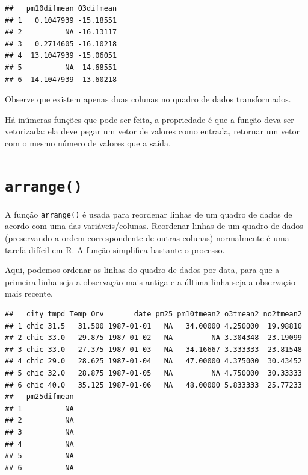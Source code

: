 \documentclass[]{book}
\newenvironment{Shaded}{\begin{snugshade}}{\end{snugshade}}
\newcommand{\KeywordTok}[1]{\textcolor[rgb]{0.13,0.29,0.53}{\textbf{#1}}}
\newcommand{\NormalTok}[1]{#1}
\newcommand{\OperatorTok}[1]{\textcolor[rgb]{0.81,0.36,0.00}{\textbf{#1}}}
\newcommand{\StringTok}[1]{\textcolor[rgb]{0.31,0.60,0.02}{#1}}
\begin{document}
\begin{verbatim}
##   pm10difmean O3difmean
## 1   0.1047939 -15.18551
## 2          NA -16.13117
## 3   0.2714605 -16.10218
## 4  13.1047939 -15.06051
## 5          NA -14.68551
## 6  14.1047939 -13.60218
\end{verbatim}

Observe que existem apenas duas colunas no quadro de dados transformados.

Há inúmeras funções que pode ser feita, a propriedade é que a função deva ser vetorizada: ela deve pegar um vetor de valores como entrada, retornar um vetor com o mesmo número de valores que a saída.

\hypertarget{arrange}{%
\section{\texorpdfstring{\texttt{arrange()}}{arrange()}}\label{arrange}}

A função \texttt{arrange()} é usada para reordenar linhas de um quadro de dados de acordo com uma das variáveis/colunas. Reordenar linhas de um quadro de dados (preservando a ordem correspondente de outras colunas) normalmente é uma tarefa difícil em R. A função simplifica bastante o processo.

Aqui, podemos ordenar as linhas do quadro de dados por data, para que a primeira linha seja a observação mais antiga e a última linha seja a observação mais recente.

\begin{Shaded}
\end{Shaded}

\begin{verbatim}
##   city tmpd Temp_Orv       date pm25 pm10tmean2 o3tmean2 no2tmean2
## 1 chic 31.5   31.500 1987-01-01   NA   34.00000 4.250000  19.98810
## 2 chic 33.0   29.875 1987-01-02   NA         NA 3.304348  23.19099
## 3 chic 33.0   27.375 1987-01-03   NA   34.16667 3.333333  23.81548
## 4 chic 29.0   28.625 1987-01-04   NA   47.00000 4.375000  30.43452
## 5 chic 32.0   28.875 1987-01-05   NA         NA 4.750000  30.33333
## 6 chic 40.0   35.125 1987-01-06   NA   48.00000 5.833333  25.77233
##   pm25difmean
## 1          NA
## 2          NA
## 3          NA
## 4          NA
## 5          NA
## 6          NA
\end{verbatim}
\end{document}
